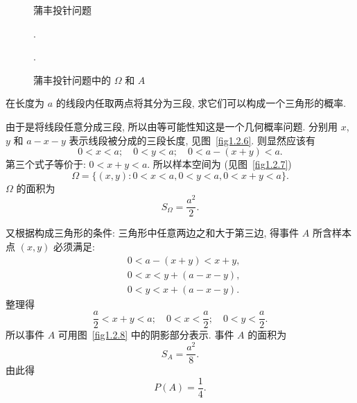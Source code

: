 \begin{figure}
    \centering
    \begin{minipage}[b]{0.5\linewidth}
        \centering
        \caption{蒲丰投针问题}.
        \label{fig1.2.4}
    \end{minipage}%
    \begin{minipage}[b]{0.5\linewidth}
        \centering
        \caption{蒲丰投针问题中的 $\Omega$ 和 $A$}.
        \label{fig1.2.5}
    \end{minipage}
\end{figure}

\begin{example}
    在长度为 $a$ 的线段内任取两点将其分为三段,
    求它们可以构成一个三角形的概率.
\end{example}

\begin{solution}
    由于是将线段任意分成三段,
    所以由等可能性知这是一个几何概率问题.
    分别用 $x$, $y$ 和 $a - x - y$ 表示线段被分成的三段长度,
    见图~\ref{fig1.2.6}.
    则显然应该有
    \[
        0 < x < a; \quad 0 < y < a; \quad 0 < a - (x + y) < a.
    \]
    第三个式子等价于:
    $0 < x + y < a$.
    所以样本空间为 (见图~\ref{fig1.2.7})
    \[
        \Omega = \{(x, y): 0 < x < a, 0 < y < a, 0 < x + y < a\}.
    \]
    $\Omega$ 的面积为
    \[
        S _\Omega = \frac{a^2}{2}.
    \]

    又根据构成三角形的条件:
    三角形中任意两边之和大于第三边,
    得事件 $A$ 所含样本点 $(x,y)$ 必须满足:
    \begin{align*}
         & 0 < a - (x + y) < x + y, \\
         & 0 < x < y + (a - x - y), \\
         & 0 < y < x + (a - x - y).
    \end{align*}
    整理得
    \[
        \frac{a}{2} < x + y < a;\quad 0 < x < \frac{a}{2}; \quad 0 < y < \frac{a}{2}.
    \]
    所以事件 $A$ 可用图~\ref{fig1.2.8} 中的阴影部分表示.
    事件 $A$ 的面积为
    \[ S _A = \frac{a^2}{8}. \]
    由此得
    \[P (A) = \frac{1}{4}. \]
\end{solution}

